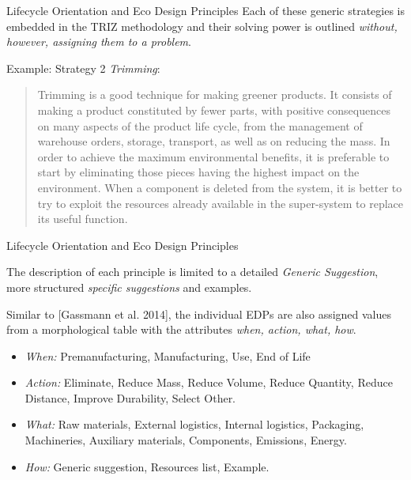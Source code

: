 \documentclass{beamer}
\begin{document}
\begin{frame}{Lifecycle Orientation and Eco Design Principles}
Each of these generic strategies is embedded in the TRIZ methodology and their
solving power is outlined \emph{without, however, assigning them to a
  problem}.
  
Example: Strategy 2 \emph{Trimming}:
\begin{quote}
  Trimming is a good technique for making greener products. It consists of
  making a product constituted by fewer parts, with positive consequences on
  many aspects of the product life cycle, from the management of warehouse
  orders, storage, transport, as well as on reducing the mass. In order to
  achieve the maximum environmental benefits, it is preferable to start by
  eliminating those pieces having the highest impact on the environment. When
  a component is deleted from the system, it is better to try to exploit the
  resources already available in the super-system to replace its useful
  function.
\end{quote}

\end{frame}

\begin{frame}{Lifecycle Orientation and Eco Design Principles}
  
The description of each principle is limited to a detailed \emph{Generic
  Suggestion}, more structured \emph{specific suggestions} and examples.

Similar to [Gassmann et al. 2014], the individual EDPs are also assigned
values from a morphological table with the attributes \emph{when, action,
  what, how}.
\begin{itemize}
\item \emph{When:} Premanufacturing, Manufacturing, Use, End of Life
\item \emph{Action:} Eliminate, Reduce Mass, Reduce Volume, Reduce Quantity,
  Reduce Distance, Improve Durability, Select Other.
\item \emph{What:} Raw materials, External logistics, Internal logistics,
  Packaging, Machineries, Auxiliary materials, Components, Emissions, Energy.
\item \emph{How:} Generic suggestion, Resources list, Example.
\end{itemize}

\end{frame}
\end{document}
